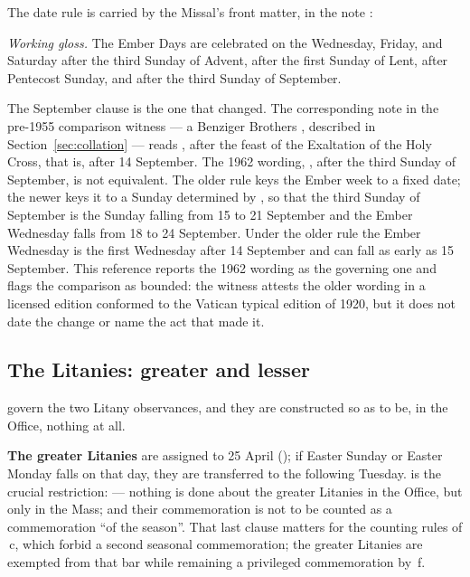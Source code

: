 The date rule is carried by the Missal's front matter, in the note :

\begin{studyframe}
\medskip

\textit{Working gloss.} The Ember Days are celebrated on the Wednesday, Friday, and Saturday
after the third Sunday of Advent, after the first Sunday of Lent, after Pentecost Sunday, and
after the third Sunday of September.
\end{studyframe}

The September clause is the one that changed. The corresponding note in the pre-1955 comparison
witness — a Benziger Brothers , described in
Section~\ref{sec:collation} — reads , after the
feast of the Exaltation of the Holy Cross, that is, after 14 September. The 1962 wording,
, after the third Sunday of September, is not
equivalent. The older rule keys the Ember week to a fixed date; the newer keys it to a Sunday
determined by , so that the third Sunday of September is the Sunday falling from 15 to
21 September and the Ember Wednesday falls from 18 to 24 September. Under the older rule the
Ember Wednesday is the first Wednesday after 14 September and can fall as early as 15 September.
This reference reports the 1962 wording as the governing one and flags the comparison as
bounded: the witness attests the older wording in a licensed edition conformed to the Vatican
typical edition of 1920, but it does not date the change or name the act that made it.

\subsection{The Litanies: greater and lesser}

 govern the two Litany observances, and they are constructed so as to be, in the
Office, nothing at all.

\textbf{The greater Litanies} are assigned to 25 April (); if Easter Sunday or Easter
Monday falls on that day, they are transferred to the following Tuesday.  is the crucial
restriction:  — nothing is
done about the greater Litanies in the Office, but only in the Mass; and their commemoration is
not to be counted as a commemoration ``of the season''. That last clause matters for the
counting rules of \,c, which forbid a second seasonal commemoration; the greater
Litanies are exempted from that bar while remaining a privileged commemoration by \,f.

